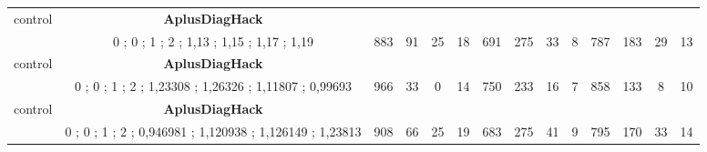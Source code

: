 \begin{table}[]
{\begin{tabular}{|c|c|c|c|c|c|c|c|c|c|c|c|c|c|}
control & \cellcolor{blue!15}\textbf{AplusDiagHack}& {\color[HTML]{00009B} } & {\color[HTML]{9A0000} } & {\color[HTML]{009901} } &  & {\color[HTML]{00009B} } & {\color[HTML]{9A0000} } & {\color[HTML]{009901} } &  & {\color[HTML]{00009B} } & {\color[HTML]{9A0000} } & {\color[HTML]{009901} } &  \\ 
 & \cellcolor{ blue!15}0 ; 0 ; 1 ; 2 ; 1,13 ; 1,15 ; 1,17 ; 1,19 & \multirow{-2}{*}{{\color[HTML]{00009B} 883}} & \multirow{-2}{*}{{\color[HTML]{9A0000} 91}} & \multirow{-2}{*}{{\color[HTML]{009901} 25}} & \multirow{-2}{*}{18} & \multirow{-2}{*}{{\color[HTML]{00009B} 691}} & \multirow{-2}{*}{{\color[HTML]{9A0000} 275}} & \multirow{-2}{*}{{\color[HTML]{009901} 33}} & \multirow{-2}{*}{8} & \multirow{-2}{*}{{\color[HTML]{00009B} 787}} & \multirow{-2}{*}{{\color[HTML]{9A0000} 183}} & \multirow{-2}{*}{{\color[HTML]{009901} 29}} & \multirow{-2}{*}{13} \\ \hline

control & \cellcolor{blue!15}\textbf{AplusDiagHack}& {\color[HTML]{00009B} } & {\color[HTML]{9A0000} } & {\color[HTML]{009901} } &  & {\color[HTML]{00009B} } & {\color[HTML]{9A0000} } & {\color[HTML]{009901} } &  & {\color[HTML]{00009B} } & {\color[HTML]{9A0000} } & {\color[HTML]{009901} } &  \\ 
 & \cellcolor{ blue!15}0 ; 0 ; 1 ; 2 ; 1,23308 ; 1,26326 ; 1,11807 ; 0,99693 & \multirow{-2}{*}{{\color[HTML]{00009B} 966}} & \multirow{-2}{*}{{\color[HTML]{9A0000} 33}} & \multirow{-2}{*}{{\color[HTML]{009901} 0}} & \multirow{-2}{*}{14} & \multirow{-2}{*}{{\color[HTML]{00009B} 750}} & \multirow{-2}{*}{{\color[HTML]{9A0000} 233}} & \multirow{-2}{*}{{\color[HTML]{009901} 16}} & \multirow{-2}{*}{7} & \multirow{-2}{*}{{\color[HTML]{00009B} 858}} & \multirow{-2}{*}{{\color[HTML]{9A0000} 133}} & \multirow{-2}{*}{{\color[HTML]{009901} 8}} & \multirow{-2}{*}{10} \\ \hline

control & \cellcolor{blue!15}\textbf{AplusDiagHack}& {\color[HTML]{00009B} } & {\color[HTML]{9A0000} } & {\color[HTML]{009901} } &  & {\color[HTML]{00009B} } & {\color[HTML]{9A0000} } & {\color[HTML]{009901} } &  & {\color[HTML]{00009B} } & {\color[HTML]{9A0000} } & {\color[HTML]{009901} } &  \\ 
 & \cellcolor{ blue!15}0 ; 0 ; 1 ; 2 ; 0,946981 ; 1,120938 ; 1,126149 ; 1,23813 & \multirow{-2}{*}{{\color[HTML]{00009B} 908}} & \multirow{-2}{*}{{\color[HTML]{9A0000} 66}} & \multirow{-2}{*}{{\color[HTML]{009901} 25}} & \multirow{-2}{*}{19} & \multirow{-2}{*}{{\color[HTML]{00009B} 683}} & \multirow{-2}{*}{{\color[HTML]{9A0000} 275}} & \multirow{-2}{*}{{\color[HTML]{009901} 41}} & \multirow{-2}{*}{9} & \multirow{-2}{*}{{\color[HTML]{00009B} 795}} & \multirow{-2}{*}{{\color[HTML]{9A0000} 170}} & \multirow{-2}{*}{{\color[HTML]{009901} 33}} & \multirow{-2}{*}{14} \\ \hline


\end{tabular}}
\end{table}
